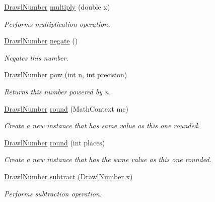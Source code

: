 \begin{DoxyCompactItemize}
\hyperlink{classcom_1_1aarrelaakso_1_1drawl_1_1_drawl_number}{Drawl\+Number} \hyperlink{classcom_1_1aarrelaakso_1_1drawl_1_1_drawl_number_a8eb1872ac149fcad193f46fc8a6fa0ad}{multiply} (double x)
\begin{DoxyCompactList}\small\item\em Performs multiplication operation. \end{DoxyCompactList}\item 
\hyperlink{classcom_1_1aarrelaakso_1_1drawl_1_1_drawl_number}{Drawl\+Number} \hyperlink{classcom_1_1aarrelaakso_1_1drawl_1_1_drawl_number_a1093e80c570f85142255528e4d31820d}{negate} ()
\begin{DoxyCompactList}\small\item\em Negates this number. \end{DoxyCompactList}\item 
\hyperlink{classcom_1_1aarrelaakso_1_1drawl_1_1_drawl_number}{Drawl\+Number} \hyperlink{classcom_1_1aarrelaakso_1_1drawl_1_1_drawl_number_aa88990d915ee2e7997180d96bb7b6312}{pow} (int n, int precision)
\begin{DoxyCompactList}\small\item\em Returns this number powered by n. \end{DoxyCompactList}\item 
\hyperlink{classcom_1_1aarrelaakso_1_1drawl_1_1_drawl_number}{Drawl\+Number} \hyperlink{classcom_1_1aarrelaakso_1_1drawl_1_1_drawl_number_a1f95d60be39632cb888dab572894822f}{round} (Math\+Context mc)
\begin{DoxyCompactList}\small\item\em Create a new instance that has same value as this one rounded. \end{DoxyCompactList}\item 
\hyperlink{classcom_1_1aarrelaakso_1_1drawl_1_1_drawl_number}{Drawl\+Number} \hyperlink{classcom_1_1aarrelaakso_1_1drawl_1_1_drawl_number_ac5efac0046896d23bab3569661a2d32c}{round} (int places)
\begin{DoxyCompactList}\small\item\em Create a new instance that has the same value as this one rounded. \end{DoxyCompactList}\item 
\hyperlink{classcom_1_1aarrelaakso_1_1drawl_1_1_drawl_number}{Drawl\+Number} \hyperlink{classcom_1_1aarrelaakso_1_1drawl_1_1_drawl_number_af22316798b9d93dc113c6e6769c6ec7f}{subtract} (\hyperlink{classcom_1_1aarrelaakso_1_1drawl_1_1_drawl_number}{Drawl\+Number} x)
\begin{DoxyCompactList}\small\item\em Performs subtraction operation. \end{DoxyCompactList}\item 

\end{DoxyCompactItemize}
